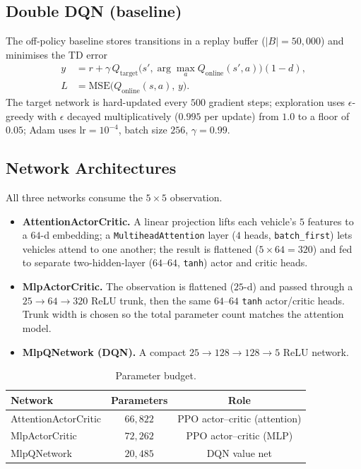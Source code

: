 \documentclass[conference]{IEEEtran}
\newcommand{\code}[1]{\texttt{#1}}
\begin{document}
\subsection{Double DQN (baseline)}
The off-policy baseline stores transitions in a replay buffer ($|B| = 50{,}000$)
and minimises the TD error
\begin{align}
y &= r + \gamma\, Q_{\mathrm{target}}\!\big(s', \arg\max_a Q_{\mathrm{online}}(s', a)\big)(1 - d), \\
L &= \mathrm{MSE}\big( Q_{\mathrm{online}}(s, a),\, y \big).
\end{align}
The target network is hard-updated every $500$ gradient steps; exploration uses
$\epsilon$-greedy with $\epsilon$ decayed multiplicatively ($0.995$ per update)
from $1.0$ to a floor of $0.05$; Adam uses $\text{lr} = 10^{-4}$, batch size
$256$, $\gamma = 0.99$.

\subsection{Network Architectures}
All three networks consume the $5 \times 5$ observation.
\begin{itemize}
\item \textbf{AttentionActorCritic.} A linear projection lifts each vehicle's
$5$ features to a $64$-d embedding; a \code{MultiheadAttention} layer ($4$
heads, \code{batch\_first}) lets vehicles attend to one another; the result is
flattened ($5 \times 64 = 320$) and fed to separate two-hidden-layer
($64$--$64$, \code{tanh}) actor and critic heads.
\item \textbf{MlpActorCritic.} The observation is flattened ($25$-d) and passed
through a $25 \to 64 \to 320$ ReLU trunk, then the same $64$--$64$ \code{tanh}
actor/critic heads. Trunk width is chosen so the total parameter count matches
the attention model.
\item \textbf{MlpQNetwork (DQN).} A compact $25 \to 128 \to 128 \to 5$ ReLU
network.
\end{itemize}

\begin{table}[t]
\caption{Parameter budget.}
\label{tab:params}
\centering
\small
\begin{tabular}{@{}lcc@{}}
\toprule
Network & Parameters & Role \\
\midrule
AttentionActorCritic & $66{,}822$ & PPO actor--critic (attention) \\
MlpActorCritic       & $72{,}262$ & PPO actor--critic (MLP) \\
MlpQNetwork          & $20{,}485$ & DQN value net \\
\bottomrule
\end{tabular}
\end{table}
\end{document}
